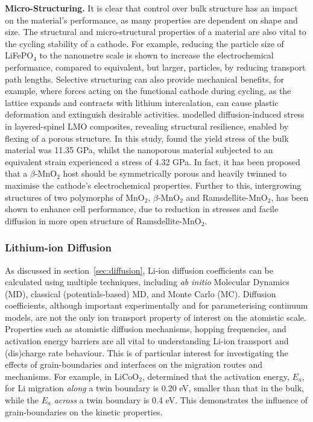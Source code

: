 \documentclass[../main.tex]{subfiles}
\begin{document}
\textbf{Micro-Structuring.} It is clear that control over bulk structure has an impact on the material's performance, as many properties are dependent on shape and size. \cite{bruce2008nanomaterials} The structural and micro-structural properties of a material are also vital to the cycling stability of a cathode. For example, reducing the particle size of LiFePO$_4$ to the nanometre scale is shown to increase the electrochemical performance, compared to equivalent, but larger, particles, by reducing transport path lengths.\cite{franger2006chemistry, ellis2007synthesis,malik2010particle} Selective structuring can also provide mechanical benefits, for example, where forces acting on the functional cathode during cycling, as the lattice expands and contracts with lithium intercalation, can cause plastic deformation and extinguish desirable activities. \citeauthor{sayle2018stress} modelled diffusion-induced stress in layered-spinel LMO composites, revealing structural resilience, enabled by flexing of a porous structure. \cite{sayle2018stress} In this study, \citeauthor{sayle2018stress} found the yield stress of the bulk material was 11.35 GPa, whilst the nanoporous material subjected to an equivalent strain experienced a stress of 4.32 GPa. In fact, it has been proposed that a $\beta$-MnO$_2$ host should be symmetrically porous and heavily twinned to maximise the cathode's electrochemical properties. \cite{sayle2009predicting} Further to this, intergrowing structures of two polymorphs of MnO$_2$, $\beta$-MnO$_2$ and Ramsdellite-MnO$_2$,\cite{Gupta2018} has been shown to enhance cell performance,\cite{GUPTA2020227619} due to reduction in stresses and facile diffusion in more open structure of Ramsdellite-MnO$_2$.

\subsubsection{Lithium-ion Diffusion}
\label{sec:cathode_ion_diffusion}
As discussed in section~\ref{sec:diffusion}, Li-ion diffusion coefficients can be calculated using multiple techniques, including \textit{ab initio} Molecular Dynamics (MD), classical (potentials-based) MD, and Monte Carlo (MC). Diffusion coefficients, although important experimentally and for parameterising continuum models, are not the only ion transport property of interest on the atomistic scale. Properties such as atomistic diffusion mechanisms, hopping frequencies, and activation energy barriers are all vital to understanding Li-ion transport and (dis)charge rate behaviour. This is of particular interest for investigating the effects of grain-boundaries and interfaces on the migration routes and mechanisms. For example, in LiCoO$_2$, \citeauthor{moriwake2013first} determined that the activation energy, $E_a$, for Li migration \textit{along} a twin boundary is 0.20 eV, smaller than that in the bulk, while the $E_a$ \textit{across} a twin boundary is 0.4 eV. \cite{moriwake2013first} This demonstrates the influence of grain-boundaries on the kinetic properties.
\end{document}

